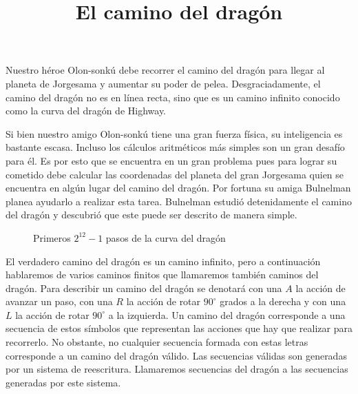 \documentclass{oci}
\title{El camino del drag\'on}
\begin{document}
\maketitle
Nuestro héroe Olon-sonkú debe recorrer el camino del dragón para llegar al planeta de Jorgesama y aumentar su poder de pelea. Desgraciadamente, el camino del dragón no es en línea recta, sino que es un camino infinito conocido como la curva del dragón de Highway.



Si bien nuestro amigo Olon-sonkú tiene una gran fuerza física, su inteligencia es bastante escasa.
Incluso los cálculos aritméticos más simples son un gran desafío para él.
Es por esto que se encuentra en un gran problema pues para lograr su cometido debe calcular las coordenadas del planeta del gran Jorgesama quien se encuentra en algún lugar del camino del dragón.
Por fortuna su amiga Bulnelman planea ayudarlo a realizar esta tarea.
Bulnelman estudió detenidamente el camino del dragón y descubrió que este puede ser descrito de manera simple.

\begin{wrapfigure}{r}{0.5\textwidth}
  \centering
  
  \caption{Primeros $2^{12}-1$ pasos de la curva del dragón}
\end{wrapfigure}

El verdadero camino del dragón es un camino infinito, pero a continuación hablaremos de varios caminos finitos que llamaremos también caminos del dragón.
Para describir un camino del dragón se denotará con una $A$ la acción de avanzar un paso, con una $R$ la acción de rotar $90^{\circ}$ grados a la derecha y con una $L$ la acción de rotar $90^{\circ}$ a la izquierda.
Un camino del dragón corresponde a una secuencia de estos símbolos que representan las acciones que hay que realizar para recorrerlo.
No obstante, no cualquier secuencia formada con estas letras corresponde a un camino del dragón válido.
Las secuencias válidas son generadas por un sistema de reescritura.
Llamaremos secuencias del dragón a las secuencias generadas por este sistema.
\end{document}
